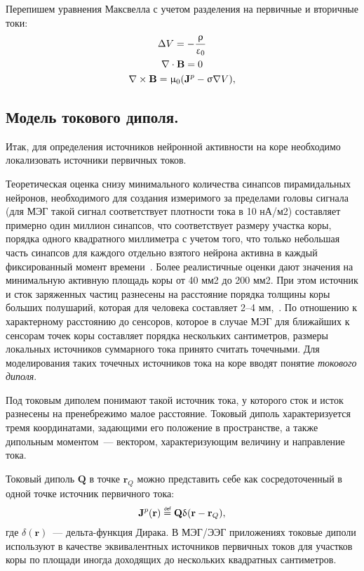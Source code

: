 Перепишем уравнения Максвелла с учетом разделения на первичные и вторичные токи:
\begin{gather}
    \Delta V = -\frac{\uprho}{\upvarepsilon_0} \label{eq:max_quasi_prim_sec1} \\
    \nabla \cdot \mathbf{B} = 0 \label{eq:max_quasi_prim_sec2} \\
    \nabla \times \mathbf{B} = \upmu_0 (\mathbf{J}^p - \upsigma \nabla V) \label{eq:max_quasi_prim_sec3},
\end{gather}

\subsection{Модель токового диполя.}

Итак, для определения источников нейронной активности на коре необходимо
локализовать источники первичных токов.

Теоретическая оценка снизу минимального количества синапсов пирамидальных
нейронов, необходимого для создания измеримого за пределами головы сигнала (для
МЭГ такой сигнал соответствует плотности тока в 10 нА/м2) составляет примерно
один миллион синапсов, что соответствует размеру участка коры, порядка одного
квадратного миллиметра с учетом того, что только небольшая часть синапсов для
каждого отдельно взятого нейрона активна в каждый фиксированный момент
времени~\cite{Hamalainen1993}.  Более реалистичные оценки дают значения на
минимальную активную площадь коры от 40 мм2 до 200 мм2.  При этом источник и
сток заряженных частиц разнесены на расстояние порядка толщины коры больших
полушарий, которая для человека составляет 2--4 мм,~\cite{saladin2011human}.
По отношению к характерному расстоянию до сенсоров, которое в случае МЭГ
для ближайших к сенсорам точек коры составляет порядка нескольких сантиметров,
размеры локальных источников суммарного тока принято считать точечными.
Для моделирования таких точечных источников тока на
коре вводят понятие \emph{токового диполя}.

Под токовым диполем понимают такой источник тока, у которого сток и исток
разнесены на пренебрежимо малое расстояние.  Токовый диполь характеризуется
тремя координатами, задающими его положение в пространстве, а также дипольным
моментом~--- вектором, характеризующим величину и направление тока.

Токовый диполь $\mathbf{Q}$ в точке $\mathbf{r}_Q$ можно представить себе как сосредоточенный
в одной точке источник первичного тока:
\begin{equation}
    \mathbf{J}^p(\mathbf{r}) \defeq \mathbf{Q}\delta(\mathbf{r} - \mathbf{r}_Q),
    \label{eq:cur_dip_def}
\end{equation}
где $\delta(\mathbf{r})$~--- дельта-функция Дирака.
В МЭГ/ЭЭГ приложениях токовые диполи используют в качестве эквивалентных источников первичных токов для
участков коры по площади иногда доходящих до нескольких квадратных сантиметров.


